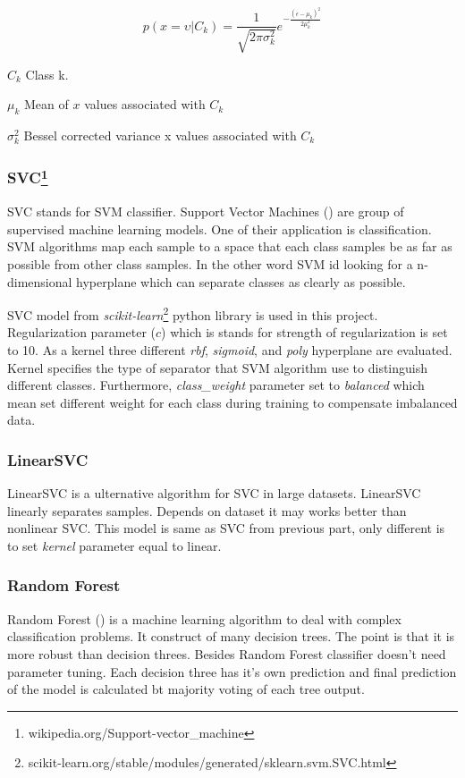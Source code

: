  \[p\left(x=\upsilon | C_{k}\right) = \frac{1}{\sqrt{2\pi\sigma_{k}^{2}}}e^{-\frac{\left(\epsilon-\mu_{k}\right)^{2}}{2\mu^{2}_{k}}}\]
\begin{eqexpl}[25mm]
	\item{$C_{k}$} Class k.
	\item{$\mu_{k}$} Mean of $x$ values associated with $C_{k}$
	\item{$\sigma^{2}_{k}$} Bessel corrected variance x values associated with $C_{k}$
\end{eqexpl}

\subsubsection{SVC\protect\footnote{wikipedia.org/Support-vector\_machine}}
\label{SVM}
SVC stands for SVM classifier. Support Vector Machines (\cite{svc})  are group of supervised machine learning models. One of their application is classification. SVM algorithms map each sample to a space that each class samples be as far as possible from other class samples. In the other word SVM id looking for a n-dimensional hyperplane which can separate classes as clearly as possible.

SVC model from \textit{scikit-learn}\footnote{scikit-learn.org/stable/modules/generated/sklearn.svm.SVC.html} python library is used in this project. Regularization parameter ($ c $) which is stands for strength of regularization is set to 10. As a kernel three different \textit{rbf}, \textit{sigmoid}, and \textit{poly} hyperplane are evaluated. Kernel specifies the type of separator that SVM algorithm use to distinguish different classes. Furthermore, \textit{class\_weight} parameter set to \textit{balanced} which mean set different weight for each class during training to compensate imbalanced data. 


\subsubsection{LinearSVC}
LinearSVC is a ulternative algorithm for SVC in large datasets. LinearSVC linearly separates samples. Depends on dataset it may works better than nonlinear SVC. This model is same as SVC from previous part, only different is to set \textit{kernel} parameter equal to linear. 
 
\subsubsection{Random Forest}
Random Forest (\cite{randomforest}) is a machine learning algorithm to deal with complex classification problems. It construct of many decision trees. The point is that it is more robust than decision threes. Besides Random Forest classifier doesn't need parameter tuning. Each decision three has it's own prediction and final prediction of the model is calculated bt majority voting of each tree output. 

